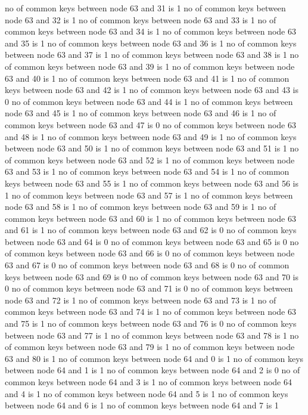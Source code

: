 no of common keys between node 63 and 31 is 1
no of common keys between node 63 and 32 is 1
no of common keys between node 63 and 33 is 1
no of common keys between node 63 and 34 is 1
no of common keys between node 63 and 35 is 1
no of common keys between node 63 and 36 is 1
no of common keys between node 63 and 37 is 1
no of common keys between node 63 and 38 is 1
no of common keys between node 63 and 39 is 1
no of common keys between node 63 and 40 is 1
no of common keys between node 63 and 41 is 1
no of common keys between node 63 and 42 is 1
no of common keys between node 63 and 43 is 0
no of common keys between node 63 and 44 is 1
no of common keys between node 63 and 45 is 1
no of common keys between node 63 and 46 is 1
no of common keys between node 63 and 47 is 0
no of common keys between node 63 and 48 is 1
no of common keys between node 63 and 49 is 1
no of common keys between node 63 and 50 is 1
no of common keys between node 63 and 51 is 1
no of common keys between node 63 and 52 is 1
no of common keys between node 63 and 53 is 1
no of common keys between node 63 and 54 is 1
no of common keys between node 63 and 55 is 1
no of common keys between node 63 and 56 is 1
no of common keys between node 63 and 57 is 1
no of common keys between node 63 and 58 is 1
no of common keys between node 63 and 59 is 1
no of common keys between node 63 and 60 is 1
no of common keys between node 63 and 61 is 1
no of common keys between node 63 and 62 is 0
no of common keys between node 63 and 64 is 0
no of common keys between node 63 and 65 is 0
no of common keys between node 63 and 66 is 0
no of common keys between node 63 and 67 is 0
no of common keys between node 63 and 68 is 0
no of common keys between node 63 and 69 is 0
no of common keys between node 63 and 70 is 0
no of common keys between node 63 and 71 is 0
no of common keys between node 63 and 72 is 1
no of common keys between node 63 and 73 is 1
no of common keys between node 63 and 74 is 1
no of common keys between node 63 and 75 is 1
no of common keys between node 63 and 76 is 0
no of common keys between node 63 and 77 is 1
no of common keys between node 63 and 78 is 1
no of common keys between node 63 and 79 is 1
no of common keys between node 63 and 80 is 1
no of common keys between node 64 and 0 is 1
no of common keys between node 64 and 1 is 1
no of common keys between node 64 and 2 is 0
no of common keys between node 64 and 3 is 1
no of common keys between node 64 and 4 is 1
no of common keys between node 64 and 5 is 1
no of common keys between node 64 and 6 is 1
no of common keys between node 64 and 7 is 1
